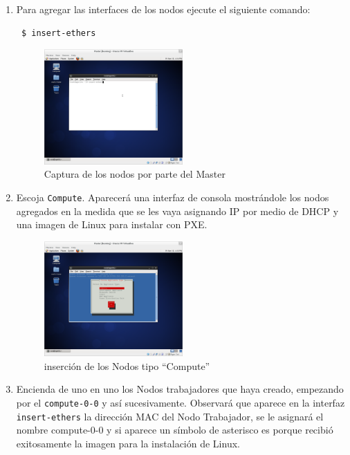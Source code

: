 \begin{enumerate}
\item Para agregar las interfaces de los nodos ejecute el siguiente comando: 


 \begin{verbatim}
 $ insert-ethers
 \end{verbatim}


\begin{figure}[H]
	\centering
	\includegraphics[width=0.5\textwidth]{aux/insert}
	\caption{Captura de los nodos por parte del Master}
\end{figure}



\item Escoja \texttt{Compute}. Aparecerá una interfaz de consola mostrándole los nodos agregados en la medida que se les vaya asignando IP por medio de DHCP y una imagen de Linux para instalar con PXE.



\begin{figure}[H]
	\centering
	\includegraphics[width=0.5\textwidth]{aux/compute}
	\caption{inserción de los Nodos tipo ``Compute''}
\end{figure}



\item Encienda de uno en uno los Nodos trabajadores que haya creado, empezando por el \texttt{compute-0-0} y así sucesivamente. Observará que aparece en la interfaz \texttt{insert-ethers} la dirección MAC del Nodo Trabajador, se le asignará el nombre compute-0-0 y si aparece un símbolo de asterisco es porque recibió exitosamente la imagen para la instalación de Linux.





\end{enumerate}
